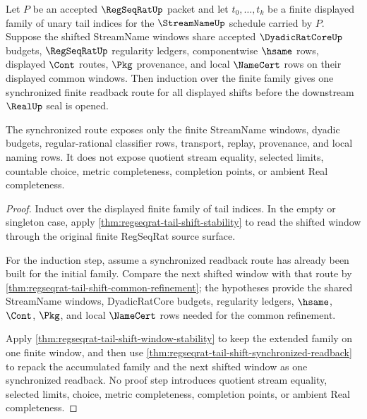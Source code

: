 \begin{theorem}
\label{thm:regseqrat-tail-shift-finite-section-induction}
Let $P$ be an accepted $\RegSeqRatUp$ packet and let $t_0,\ldots,t_k$ be a finite displayed family of unary tail indices for the $\StreamNameUp$ schedule carried by $P$. Suppose the shifted StreamName windows share accepted $\DyadicRatCoreUp$ budgets, $\RegSeqRatUp$ regularity ledgers, componentwise $\hsame$ rows, displayed $\Cont$ routes, $\Pkg$ provenance, and local $\NameCert$ rows on their displayed common windows. Then induction over the finite family gives one synchronized finite readback route for all displayed shifts before the downstream $\RealUp$ seal is opened.

The synchronized route exposes only the finite StreamName windows, dyadic budgets, regular-rational classifier rows, transport, replay, provenance, and local naming rows. It does not expose quotient stream equality, selected limits, countable choice, metric completeness, completion points, or ambient Real completeness.
\end{theorem}
\begin{proof}
Induct over the displayed finite family of tail indices. In the empty or singleton case, apply \autoref{thm:regseqrat-tail-shift-stability} to read the shifted window through the original finite RegSeqRat source surface.

For the induction step, assume a synchronized readback route has already been built for the initial family. Compare the next shifted window with that route by \autoref{thm:regseqrat-tail-shift-common-refinement}; the hypotheses provide the shared StreamName windows, DyadicRatCore budgets, regularity ledgers, $\hsame$, $\Cont$, $\Pkg$, and local $\NameCert$ rows needed for the common refinement.

Apply \autoref{thm:regseqrat-tail-shift-window-stability} to keep the extended family on one finite window, and then use \autoref{thm:regseqrat-tail-shift-synchronized-readback} to repack the accumulated family and the next shifted window as one synchronized readback. No proof step introduces quotient stream equality, selected limits, choice, metric completeness, completion points, or ambient Real completeness.
\end{proof}

